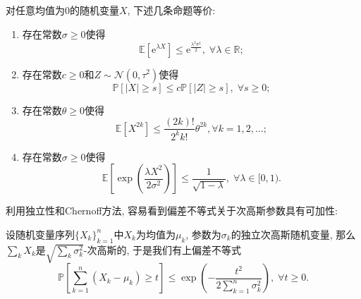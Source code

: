\begin{theorem}[次高斯随机变量的等价定义]
	对任意均值为$0$的随机变量$X$, 下述几条命题等价: 
	\begin{enumerate}[label=(\Roman*)]
		\item 存在常数$\sigma \geq 0$使得
			\begin{equation*}
				\mathbb{E}[\mathrm{e}^{\lambda X} ] \leq \mathrm{e}^{\frac{\lambda^2 \sigma^2}{2}},\; \forall \lambda \in \mathbb{R}; 
			\end{equation*}
		\item 存在常数$c \geq 0$和$Z \sim \mathcal{N}(0, \tau^2)$使得
			\begin{equation*}
				\mathbb{P}[|X| \geq s] \leq c \mathbb{P}[|Z| \geq s],\; \forall s \geq 0; 
			\end{equation*}
		\item 存在常数$\theta \geq 0$使得
			\begin{equation*}
				\mathbb{E}[X^{2k}] \leq \frac{(2k)!}{2^k k!} \theta^{2k}, \forall k = 1,2,\dots;
			\end{equation*}
		\item 存在常数$\sigma \geq 0$使得
			\begin{equation*}
				\mathbb{E}\left[ \exp\left(\frac{\lambda X^2}{2 \sigma^2}\right) \right] \leq \frac{1}{\sqrt{1 - \lambda}},\; \forall \lambda \in [0,1).
			\end{equation*}
	\end{enumerate}
\end{theorem}

利用独立性和Chernoff方法, 容易看到偏差不等式关于次高斯参数具有可加性: 
\begin{proposition}[Hoeffding界]\label{thm:HoeffdingBd}
	设随机变量序列$\{X_k\}_{k=1}^n$中$X_k$为均值为$\mu_k$, 参数为$\sigma_k$的独立次高斯随机变量, 那么$\sum_k X_k$是$\sqrt{\sum_k \sigma_k^2}$-次高斯的, 于是我们有上偏差不等式
	\begin{equation*}
		\mathbb{P} \left[ \sum_{k=1}^n (X_k - \mu_k) \geq t \right]
		\leq \exp \left( - \frac{t^2}{2 \sum_{k=1}^n \sigma_k^2} \right ),\; 
		\forall t \geq 0.
	\end{equation*}
\end{proposition}

